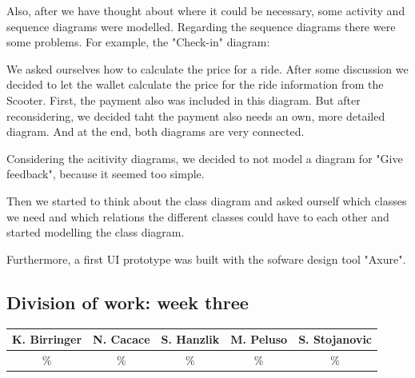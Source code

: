 \documentclass[a4paper, 12pt]{article}
\begin{document}
Also, after we have thought about where it could be necessary, some activity and sequence diagrams were modelled.
Regarding the sequence diagrams there were some problems.
For example, the "Check-in" diagram:

We asked ourselves how to calculate the price for a ride. After some discussion we decided to let the wallet calculate the price for the ride information from the Scooter.
First, the payment also was included in this diagram. But after reconsidering, we decided taht the payment also needs an own, more detailed diagram. And at the end, both diagrams are very connected.

Considering the acitivity diagrams, we decided to not model a diagram for "Give feedback", because it seemed too simple.

Then we started to think about the class diagram and asked ourself which classes we need and which relations the different classes could have to each other and started modelling the class diagram.

Furthermore, a first UI prototype was built with the sofware design tool "Axure". \cite{axure}

\newpage
\subsection{Division of work: week three}

\begin{table}[h]
\centering
\setlength{\tabcolsep}{12pt}
\begin{tabular}{|c|c|c|c|c|}
\hline
K. Birringer & N. Cacace & S. Hanzlik & M. Peluso & S. Stojanovic\\
\hline
\% & \% & \% & \% & \% \\ 
\hline
\end{tabular}
\end{table}

\end{document}
